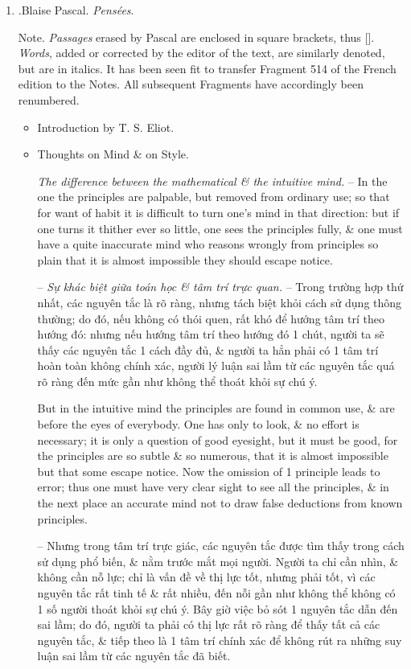 \documentclass{article}
\begin{document}
\begin{enumerate}
	\item \cite{Pascal_pensees}.{\sc Blaise Pascal}. {\it Pens\'ees}.
	
	{\sf Note.} {\it Passages} erased by {\sc Pascal} are enclosed in square brackets, thus []. {\it Words}, added or corrected by the editor of the text, are similarly denoted, but are in italics. It has been seen fit to transfer Fragment 514 of the French edition to the Notes. All subsequent Fragments have accordingly been renumbered.
	\begin{itemize}
		\item {\sf Introduction by {\sc T. S. Eliot}.}
		\item {\sf Thoughts on Mind \& on Style.}
		
		 {\it The difference between the mathematical \& the intuitive mind.} -- In the one the principles are palpable, but removed from ordinary use; so that for want of habit it is difficult to turn one's mind in that direction: but if one turns it thither ever so little, one sees the principles fully, \& one must have a quite inaccurate mind who reasons wrongly from principles so plain that it is almost impossible they should escape notice.
		
		-- {\it Sự khác biệt giữa toán học \& tâm trí trực quan.} -- Trong trường hợp thứ nhất, các nguyên tắc là rõ ràng, nhưng tách biệt khỏi cách sử dụng thông thường; do đó, nếu không có thói quen, rất khó để hướng tâm trí theo hướng đó: nhưng nếu hướng tâm trí theo hướng đó 1 chút, người ta sẽ thấy các nguyên tắc 1 cách đầy đủ, \& người ta hẳn phải có 1 tâm trí hoàn toàn không chính xác, người lý luận sai lầm từ các nguyên tắc quá rõ ràng đến mức gần như không thể thoát khỏi sự chú ý.
		
		But in the intuitive mind the principles are found in common use, \& are before the eyes of everybody. One has only to look, \& no effort is necessary; it is only a question of good eyesight, but it must be good, for the principles are so subtle \& so numerous, that it is almost impossible but that some escape notice. Now the omission of 1 principle leads to error; thus one must have very clear sight to see all the principles, \& in the next place an accurate mind not to draw false deductions from known principles.
		
		-- Nhưng trong tâm trí trực giác, các nguyên tắc được tìm thấy trong cách sử dụng phổ biến, \& nằm trước mắt mọi người. Người ta chỉ cần nhìn, \& không cần nỗ lực; chỉ là vấn đề về thị lực tốt, nhưng phải tốt, vì các nguyên tắc rất tinh tế \& rất nhiều, đến nỗi gần như không thể không có 1 số người thoát khỏi sự chú ý. Bây giờ việc bỏ sót 1 nguyên tắc dẫn đến sai lầm; do đó, người ta phải có thị lực rất rõ ràng để thấy tất cả các nguyên tắc, \& tiếp theo là 1 tâm trí chính xác để không rút ra những suy luận sai lầm từ các nguyên tắc đã biết.
				

\end{itemize}
\end{enumerate}
\end{document}

